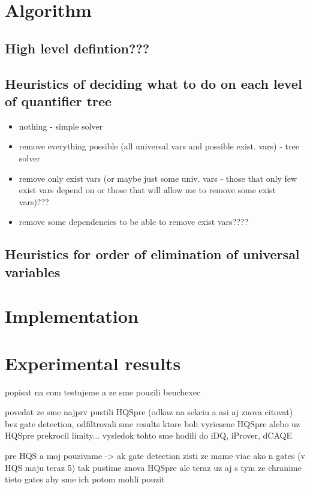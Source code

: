 \documentclass[
  digital, %
  twoside, %
  table,   %
  nolof,     %
  nolot,     %
]{fithesis3}
\theoremstyle{definition}
\theoremstyle{remark}
\begin{document}
\chapter{Algorithm}
\label{chap:algorithm}

\section{High level defintion???}

\section{Heuristics of deciding what to do on each level of quantifier tree}
\begin{itemize}
    \item nothing - simple solver
    \item remove everything possible (all universal vars and possible exist. vars) - tree solver
    \item remove only exist vars (or maybe just some univ. vars - those that only few exist vars depend on or those that will allow me to remove some exist vars)???
    \item remove some dependencies to be able to remove exist vars????
\end{itemize}

\section{Heuristics for order of elimination of universal variables}

\chapter{Implementation}

\chapter{Experimental results}
popisat na com testujeme a ze sme pouzili benchexec

povedat ze sme najprv pustili HQSpre (odkaz na sekciu a asi aj znova citovat) bez gate detection, odfiltrovali sme results ktore boli vyriesene HQSpre alebo uz HQSpre prekrocil limity... vysledok tohto sme hodili do iDQ, iProver, dCAQE

pre HQS a moj pouzivame -> ak gate detection zisti ze mame viac ako n gates (v HQS maju teraz 5) tak pustime znova HQSpre ale teraz uz aj s tym ze chranime tieto gates aby sme ich potom mohli pouzit
\end{document}
